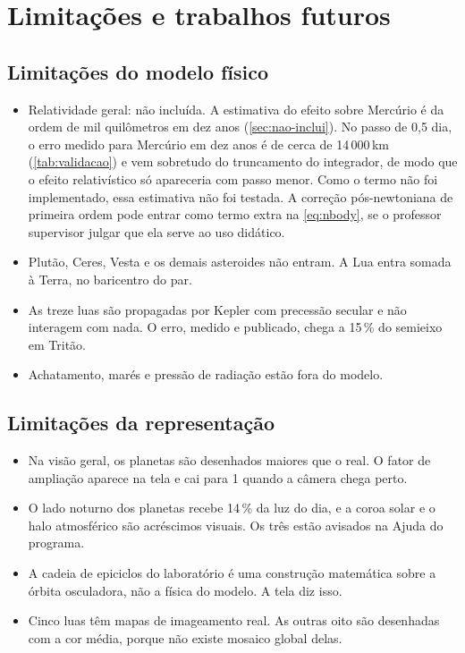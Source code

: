 \chapter{Limitações e trabalhos futuros}\label{cap:limitacoes}

\section{Limitações do modelo físico}

\begin{itemize}
  \item Relatividade geral: não incluída. A estimativa do efeito sobre Mercúrio é da ordem de mil quilômetros em dez anos (\autoref{sec:nao-inclui}). No passo de 0,5 dia, o erro medido para Mercúrio em dez anos é de cerca de 14\,000\,km (\autoref{tab:validacao}) e vem sobretudo do truncamento do integrador, de modo que o efeito relativístico só apareceria com passo menor. Como o termo não foi implementado, essa estimativa não foi testada. A correção pós-newtoniana de primeira ordem pode entrar como termo extra na \autoref{eq:nbody}, se o professor supervisor julgar que ela serve ao uso didático.
  \item Plutão, Ceres, Vesta e os demais asteroides não entram. A Lua entra somada à Terra, no baricentro do par.
  \item As treze luas são propagadas por Kepler com precessão secular e não interagem com nada. O erro, medido e publicado, chega a 15\,\% do semieixo em Tritão.
  \item Achatamento, marés e pressão de radiação estão fora do modelo.
\end{itemize}

\section{Limitações da representação}

\begin{itemize}
  \item Na visão geral, os planetas são desenhados maiores que o real. O fator de ampliação aparece na tela e cai para 1 quando a câmera chega perto.
  \item O lado noturno dos planetas recebe 14\,\% da luz do dia, e a coroa solar e o halo atmosférico são acréscimos visuais. Os três estão avisados na Ajuda do programa.
  \item A cadeia de epiciclos do laboratório é uma construção matemática sobre a órbita osculadora, não a física do modelo. A tela diz isso.
  \item Cinco luas têm mapas de imageamento real. As outras oito são desenhadas com a cor média, porque não existe mosaico global delas.
\end{itemize}

